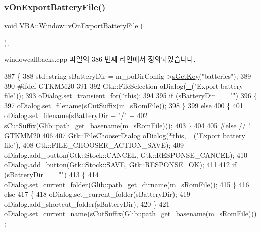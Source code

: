 \subsubsection{\texorpdfstring{v\+On\+Export\+Battery\+File()}{vOnExportBatteryFile()}}
{\footnotesize\ttfamily void V\+B\+A\+::\+Window\+::v\+On\+Export\+Battery\+File (\begin{DoxyParamCaption}{ }\end{DoxyParamCaption})\hspace{0.3cm}{\ttfamily [protected]}, {\ttfamily [virtual]}}



windowcallbacks.\+cpp 파일의 386 번째 라인에서 정의되었습니다.


\begin{DoxyCode}
387 \{
388   std::string sBatteryDir = m\_poDirConfig->\mbox{\hyperlink{class_v_b_a_1_1_config_1_1_section_a7ac9dfabf38bc1db83a6017e130f04ac}{sGetKey}}(\textcolor{stringliteral}{"batteries"});
389 
390 \textcolor{preprocessor}{#ifdef GTKMM20}
391 
392   Gtk::FileSelection oDialog(\mbox{\hyperlink{getopt_8c_a86a239addea586602343007a370bf8ad}{\_}}(\textcolor{stringliteral}{"Export battery file"}));
393   oDialog.set\_transient\_for(*\textcolor{keyword}{this});
394 
395   \textcolor{keywordflow}{if} (sBatteryDir == \textcolor{stringliteral}{""})
396   \{
397     oDialog.set\_filename(\mbox{\hyperlink{namespace_v_b_a_ad362cd74dbe4234578a0a124f3522dcf}{sCutSuffix}}(m\_sRomFile));
398   \}
399   \textcolor{keywordflow}{else}
400   \{
401     oDialog.set\_filename(sBatteryDir + \textcolor{stringliteral}{"/"} +
402                          \mbox{\hyperlink{namespace_v_b_a_ad362cd74dbe4234578a0a124f3522dcf}{sCutSuffix}}(Glib::path\_get\_basename(m\_sRomFile)));
403   \}
404 
405 \textcolor{preprocessor}{#else // ! GTKMM20}
406 
407   Gtk::FileChooserDialog oDialog(*\textcolor{keyword}{this}, \mbox{\hyperlink{getopt_8c_a86a239addea586602343007a370bf8ad}{\_}}(\textcolor{stringliteral}{"Export battery file"}),
408                                  Gtk::FILE\_CHOOSER\_ACTION\_SAVE);
409   oDialog.add\_button(Gtk::Stock::CANCEL, Gtk::RESPONSE\_CANCEL);
410   oDialog.add\_button(Gtk::Stock::SAVE,   Gtk::RESPONSE\_OK);
411 
412   \textcolor{keywordflow}{if} (sBatteryDir == \textcolor{stringliteral}{""})
413   \{
414     oDialog.set\_current\_folder(Glib::path\_get\_dirname(m\_sRomFile));
415   \}
416   \textcolor{keywordflow}{else}
417   \{
418     oDialog.set\_current\_folder(sBatteryDir);
419     oDialog.add\_shortcut\_folder(sBatteryDir);
420   \}
421   oDialog.set\_current\_name(\mbox{\hyperlink{namespace_v_b_a_ad362cd74dbe4234578a0a124f3522dcf}{sCutSuffix}}(Glib::path\_get\_basename(m\_sRomFile)));

\end{DoxyCode}

